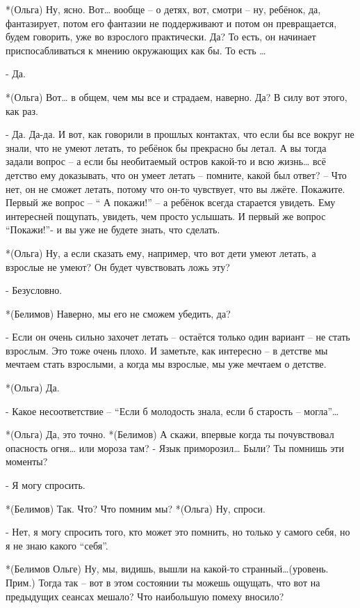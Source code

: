 *(Ольга) Ну, ясно. Вот… вообще – о детях, вот, смотри – ну, ребёнок, да, фантазирует, потом его фантазии не поддерживают и потом он превращается, будем говорить, уже во взрослого практически. Да? То есть, он начинает приспосабливаться к мнению окружающих как бы. То есть …

- Да.

*(Ольга) Вот… в общем, чем мы все и страдаем, наверно. Да? В силу вот этого, как раз.

- Да. Да-да. И вот, как говорили в прошлых контактах, что если бы все вокруг не знали, что не умеют летать, то ребёнок бы прекрасно бы летал. А вы тогда задали вопрос – а если бы необитаемый остров какой-то и всю жизнь… всё детство ему доказывать, что он умеет летать – помните, какой был ответ? – Что нет, он не сможет летать, потому что он-то чувствует, что вы лжёте. Покажите. Первый же вопрос – “ А покажи!” – а ребёнок всегда старается увидеть. Ему интересней пощупать, увидеть, чем просто услышать. И первый же вопрос “Покажи!”-  и вы уже не будете знать, что сделать.

*(Ольга) Ну, а если сказать ему, например, что вот дети умеют летать, а взрослые не умеют? Он будет чувствовать ложь эту?

- Безусловно.

*(Белимов) Наверно, мы его не сможем убедить, да?

- Если он очень сильно захочет летать – остаётся только один вариант – не стать взрослым. Это тоже очень плохо. И заметьте, как интересно – в детстве мы мечтаем стать взрослыми, а когда мы взрослые, мы уже мечтаем о детстве.

*(Ольга) Да.

- Какое несоответствие – “Если б молодость знала, если б  старость – могла”…

*(Ольга) Да, это точно.
*(Белимов) А скажи, впервые когда ты почувствовал опасность огня… или мороза там? - Язык приморозил… Были? Ты помнишь эти моменты?

- Я могу спросить.

*(Белимов) Так. Что? Что помним мы?
*(Ольга) Ну, спроси.

- Нет, я могу спросить того, кто может это помнить, но только у самого себя, но я не знаю какого “себя”.

*(Белимов Ольге) Ну, мы, видишь, вышли на какой-то странный…(уровень. Прим.) Тогда так – вот в этом состоянии ты можешь ощущать, что вот на предыдущих сеансах мешало? Что наибольшую помеху вносило?

